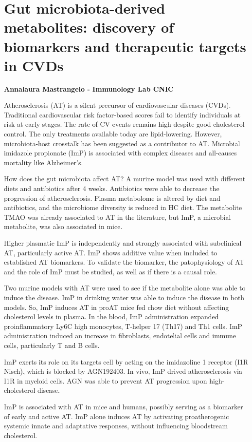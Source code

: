 \section{Gut microbiota-derived metabolites: discovery of biomarkers and therapeutic targets in CVDs}
\textbf{Annalaura Mastrangelo - Immunology Lab CNIC}

Atherosclerosis (AT) is a silent precursor of cardiovascular diseases (CVDs). Traditional cardiovascular risk factor-based scores fail to identify individuals at risk at early stages. The rate of CV events remains high despite good cholesterol control. The only treatments available today are lipid-lowering. However, microbiota-host crosstalk has been suggested as a contributor to AT. Microbial imidazole propionate (ImP) is associated with complex diseases and all-causes mortality like Alzheimer's.

How does the gut microbiota affect AT? A murine model was used with different diets and antibiotics after 4 weeks. Antibiotics were able to decrease the progression of atherosclerosis. Plasma metabolome is altered by diet and antibiotics, and the microbiome diversity is reduced in HC diet. The metabolite TMAO was already associated to AT in the literature, but ImP, a microbial metabolite, was also associated in mice. 

Higher plasmatic ImP is independently and strongly associated with subclinical AT, particularly active AT. ImP shows additive value when included to established AT biomarkers. To validate the biomarker, the patophysiology of AT and the role of ImP must be studied, as well as if there is a causal role. 

Two murine models with AT were used to see if the metabolite alone was able to induce the disease. ImP in drinking water was able to induce the disease in both models. So, ImP induces AT in proAT mice fed chow diet without affecting cholesterol levels in plasma. In the blood, ImP administration expanded proinflammatory Ly6C high monocytes, T-helper 17 (Th17) and Th1 cells. ImP administration induced an increase in fibroblasts, endotelial cells and immune cells, particularly T and B cells. 

ImP exerts its role on its targets cell by acting on the imidazoline 1 receptor (I1R Nisch), which is blocked by AGN192403. In vivo, ImP drived atherosclerosis via I1R in myeloid cells. AGN was able to prevent AT progression upon high-cholesterol disease.

ImP is associated with AT in mice and humans, possibly serving as a biomarker of early and active AT. 
ImP alone induces AT by activating proatherogenic systemic innate and adaptative responses, without influencing bloodstream cholesterol. 

